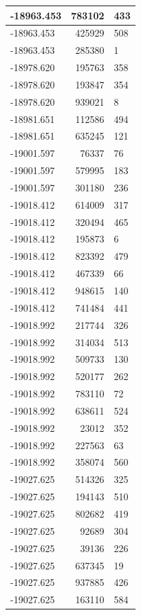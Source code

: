 \documentclass[]{book}
\theoremstyle{definition}
\theoremstyle{definition}
\theoremstyle{definition}
\theoremstyle{remark}
\begin{document}
\begin{tabular}{l|r|l}
\hline
-18963.453 & 783102 & 433\\
\hline
-18963.453 & 425929 & 508\\
\hline
-18963.453 & 285380 & 1\\
\hline
-18978.620 & 195763 & 358\\
\hline
-18978.620 & 193847 & 354\\
\hline
-18978.620 & 939021 & 8\\
\hline
-18981.651 & 112586 & 494\\
\hline
-18981.651 & 635245 & 121\\
\hline
-19001.597 & 76337 & 76\\
\hline
-19001.597 & 579995 & 183\\
\hline
-19001.597 & 301180 & 236\\
\hline
-19018.412 & 614009 & 317\\
\hline
-19018.412 & 320494 & 465\\
\hline
-19018.412 & 195873 & 6\\
\hline
-19018.412 & 823392 & 479\\
\hline
-19018.412 & 467339 & 66\\
\hline
-19018.412 & 948615 & 140\\
\hline
-19018.412 & 741484 & 441\\
\hline
-19018.992 & 217744 & 326\\
\hline
-19018.992 & 314034 & 513\\
\hline
-19018.992 & 509733 & 130\\
\hline
-19018.992 & 520177 & 262\\
\hline
-19018.992 & 783110 & 72\\
\hline
-19018.992 & 638611 & 524\\
\hline
-19018.992 & 23012 & 352\\
\hline
-19018.992 & 227563 & 63\\
\hline
-19018.992 & 358074 & 560\\
\hline
-19027.625 & 514326 & 325\\
\hline
-19027.625 & 194143 & 510\\
\hline
-19027.625 & 802682 & 419\\
\hline
-19027.625 & 92689 & 304\\
\hline
-19027.625 & 39136 & 226\\
\hline
-19027.625 & 637345 & 19\\
\hline
-19027.625 & 937885 & 426\\
\hline
-19027.625 & 163110 & 584\\

\end{tabular}
\end{document}
